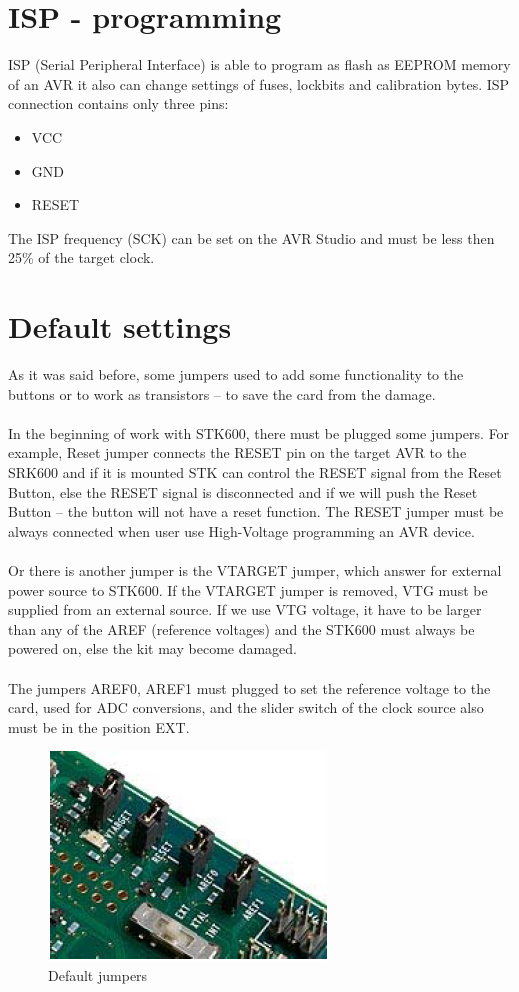 \documentclass[english]{article}
\begin{document}
\section{ISP - programming}
ISP (Serial Peripheral Interface)  is able to program as flash as EEPROM memory of an AVR it also can change settings of fuses, lockbits and calibration bytes. ISP connection contains only three pins:
\begin{itemize}
\item VCC
\item GND
\item RESET
\end{itemize}

The ISP frequency (SCK) can be set on the AVR Studio and must be less then 25\% of the target clock.

\section{Default settings}
As it was said before, some jumpers used to add some functionality to the buttons or to work as transistors – to save the card from the damage. \\\\
In the beginning of work with STK600, there must be plugged some jumpers. For example, Reset jumper connects the RESET pin on the target AVR to the SRK600 and if it is mounted STK can control the RESET signal from the Reset Button, else the RESET signal is disconnected and if we will push the Reset Button – the button will not have a reset function. The RESET jumper must be always connected when user use High-Voltage programming an AVR device.\\\\
Or there is another jumper is the VTARGET jumper, which answer for external power source to STK600. If the VTARGET jumper is removed, VTG must be supplied from an external source. If we use VTG voltage, it have to be larger than any of the AREF (reference voltages) and the STK600 must always be powered on, else the kit may become damaged.\\\\
The jumpers AREF0, AREF1 must plugged to set the reference voltage to the card, used for ADC conversions, and the slider switch of the clock source also must be in the position EXT.
 \begin{figure}[H]
\centerline{\includegraphics[scale=0.8]{MicroLab2/image010}}
\caption{Default jumpers}
\end{figure}
\end{document}
